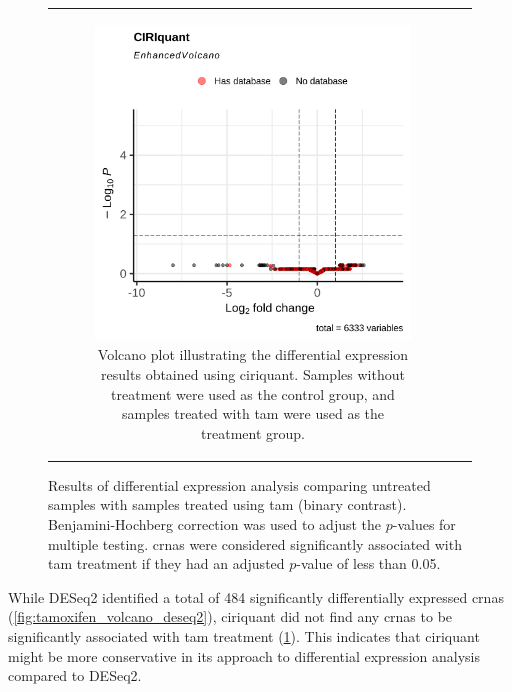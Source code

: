 \begin{figure}[H]
\begin{tabular}{cc}
\begin{subfigure}{0.5\textwidth}
            \includegraphics[width=\linewidth]{chapters/4_results_and_discussion/figures/dea/ciriquant/tamoxifen/volcano.png}
            \caption{Volcano plot illustrating the differential expression
                results obtained using \gls{ciriquant}.
                Samples without treatment were used as the control group, and samples treated
                with \gls{tam} were used as the treatment group.
            }
            \label{fig:tamoxifen_volcano_ciriquant}
        \end{subfigure}

    \end{tabular}
    \caption{Results of differential expression analysis comparing untreated
        samples with samples treated using \gls{tam} (binary contrast).
        Benjamini-Hochberg correction\supercite{benjamini_controlling_1995} was used to
        adjust the $p$-values for multiple testing.
        \Glspl{crna} were considered significantly associated with \gls{tam}
        treatment if they had an adjusted $p$-value of less than 0.05.
    } \label{fig:tamoxifen_volcano} \end{figure}

While DESeq2 identified a total of 484 significantly differentially expressed
\glspl{crna} (\cref{fig:tamoxifen_volcano_deseq2}), \gls{ciriquant} did not
find any \glspl{crna} to be significantly associated with \gls{tam} treatment
(\cref{fig:tamoxifen_volcano_ciriquant}).
This indicates that \gls{ciriquant} might be more conservative in its approach
to differential expression analysis compared to DESeq2.

